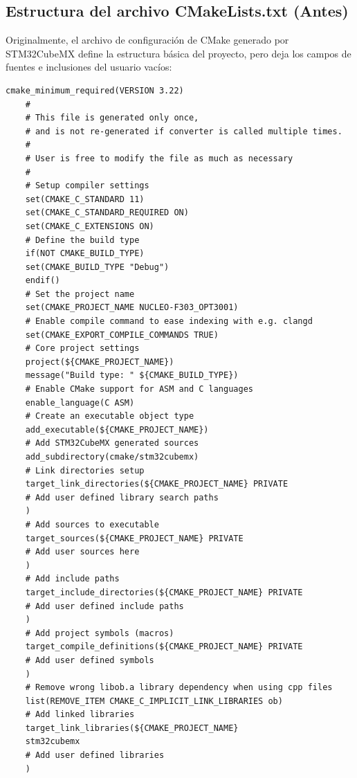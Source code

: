 \documentclass[
10pt, %
a4paper, %
oneside, %
headinclude,footinclude, %
BCOR5mm, %
]{scrartcl}
\begin{document}
\subsection{Estructura del archivo CMakeLists.txt (Antes)}
Originalmente, el archivo de configuración de CMake generado por STM32CubeMX define la estructura básica del proyecto, pero deja los campos de fuentes e inclusiones del usuario vacíos:
\begin{lstlisting}[style=CMakeStyle]
	cmake_minimum_required(VERSION 3.22)
	#
	# This file is generated only once,
	# and is not re-generated if converter is called multiple times.
	#
	# User is free to modify the file as much as necessary
	#
	# Setup compiler settings
	set(CMAKE_C_STANDARD 11)
	set(CMAKE_C_STANDARD_REQUIRED ON)
	set(CMAKE_C_EXTENSIONS ON)
	# Define the build type
	if(NOT CMAKE_BUILD_TYPE)
	set(CMAKE_BUILD_TYPE "Debug")
	endif()
	# Set the project name
	set(CMAKE_PROJECT_NAME NUCLEO-F303_OPT3001)
	# Enable compile command to ease indexing with e.g. clangd
	set(CMAKE_EXPORT_COMPILE_COMMANDS TRUE)
	# Core project settings
	project(${CMAKE_PROJECT_NAME})
	message("Build type: " ${CMAKE_BUILD_TYPE})
	# Enable CMake support for ASM and C languages
	enable_language(C ASM)
	# Create an executable object type
	add_executable(${CMAKE_PROJECT_NAME})
	# Add STM32CubeMX generated sources
	add_subdirectory(cmake/stm32cubemx)
	# Link directories setup
	target_link_directories(${CMAKE_PROJECT_NAME} PRIVATE
	# Add user defined library search paths
	)
	# Add sources to executable
	target_sources(${CMAKE_PROJECT_NAME} PRIVATE
	# Add user sources here
	)
	# Add include paths
	target_include_directories(${CMAKE_PROJECT_NAME} PRIVATE
	# Add user defined include paths
	)
	# Add project symbols (macros)
	target_compile_definitions(${CMAKE_PROJECT_NAME} PRIVATE
	# Add user defined symbols
	)
	# Remove wrong libob.a library dependency when using cpp files
	list(REMOVE_ITEM CMAKE_C_IMPLICIT_LINK_LIBRARIES ob)
	# Add linked libraries
	target_link_libraries(${CMAKE_PROJECT_NAME}
	stm32cubemx
	# Add user defined libraries
	)
\end{lstlisting}
\end{document}
